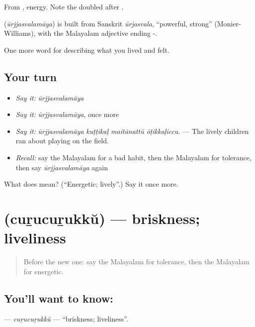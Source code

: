 From , energy. Note the doubled  after .

\begin{cousinweb}
\textbf{} (\emph{ūrjjasvalamāya}) is built from Sanskrit \emph{ūrjasvala}, \textquotedblleft{}powerful, strong\textquotedblright{} (Monier-Williams), with the Malayalam adjective ending -.
\end{cousinweb}

\begin{grammarlens}[title={What you've built}]
One more word for describing what you lived and felt.
\end{grammarlens}

\subsection*{Your turn}
\begin{itemize}
\raggedright
  \item \emph{Say it:} \emph{ūrjjasvalamāya}
  \item \emph{Say it:} \emph{ūrjjasvalamāya}, once more
  \item \emph{Say it:} \emph{ūrjjasvalamāya kuṭṭikaḷ maitānattŭ ōṭikkaḷiccu.} — The lively children ran about playing on the field.
  \item \emph{Recall:} say the Malayalam for a bad habit, then the Malayalam for tolerance, then say \emph{ūrjjasvalamāya} again
\end{itemize}

\begin{tcolorbox}[breakable,colback=teal!4,colframe=teal!35!black,title={Before you move on}]
What does  mean? (\textquotedblleft{}Energetic; lively\textquotedblright{}.) Say it once more.
\end{tcolorbox}
\section[\texorpdfstring{\ml{ചുറുചുറുക്ക്} (cuṟucuṟukkŭ)}{ചുറുചുറുക്ക് (cuṟucuṟukkŭ)}]{ (cuṟucuṟukkŭ) — briskness; liveliness}

\label{lesson:ML-C530-curucurukku}



\begin{quote}
Before the new one: say the Malayalam for tolerance, then the Malayalam for energetic.
\end{quote}

\subsection*{You'll want to know: }
\textbf{} — \emph{cuṟucuṟukkŭ} — \textquotedblleft{}briskness; liveliness\textquotedblright{}.

